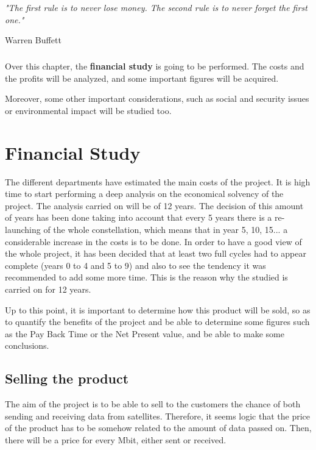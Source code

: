 \epigraph{\textit{"The first rule is to never lose money. The second rule is to never forget the first one."}}{Warren Buffett} 

\paragraph{}

Over this chapter, the \textbf{financial study} is going to be performed. The costs and the profits will be analyzed, and some important figures will be acquired. 

Moreover, some other important considerations, such as social and security issues or environmental impact will be studied too.

\chapter{Financial Study}

The different departments have estimated the main costs of the project. It is high time to start performing a deep analysis on the economical solvency of the project. The analysis carried on will be of 12 years. The decision of this amount of years has been done taking into account that every 5 years there is a re-launching of the whole constellation, which means that in year 5, 10, 15... a considerable increase in the costs is to be done. In order to have a good view of the whole project, it has been decided that at least two full cycles had to appear complete (years 0 to 4 and 5 to 9) and also to see the tendency it was recommended to add some more time. This is the reason why the studied is carried on for 12 years. 

Up to this point, it is important to determine how this product will be sold, so as to quantify the benefits of the project and be able to determine some figures such as the Pay Back Time or the Net Present value, and be able to make some conclusions. 

\section{Selling the product}

The aim of the project is to be able to sell to the customers the chance of both sending and receiving data from satellites. Therefore, it seems logic that the price of the product has to be somehow related to the amount of data passed on. Then, there will be a price for every Mbit, either sent or received. 


